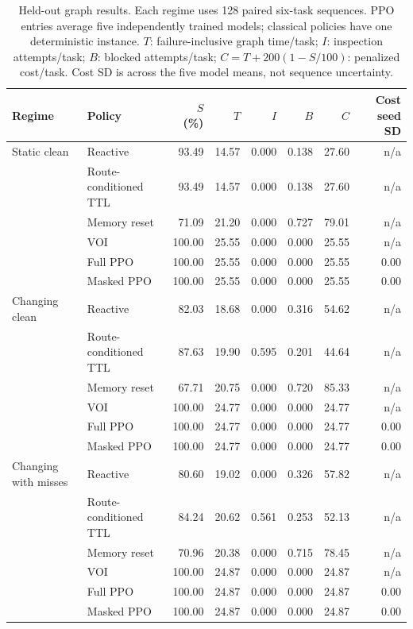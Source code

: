 \begin{table}[t]
\caption{Held-out graph results. Each regime uses 128 paired six-task sequences. PPO entries average five independently trained models; classical policies have one deterministic instance. $T$: failure-inclusive graph time/task; $I$: inspection attempts/task; $B$: blocked attempts/task; $C=T+200(1-S/100)$: penalized cost/task. Cost SD is across the five model means, not sequence uncertainty.}
\label{tab:results}\centering\small
\begin{tabular}{llrrrrrr}\hline
Regime & Policy & $S$ (\%) & $T$ & $I$ & $B$ & $C$ & Cost seed SD \\ \hline
Static clean & Reactive & 93.49 & 14.57 & 0.000 & 0.138 & 27.60 & n/a \\
 & Route-conditioned TTL & 93.49 & 14.57 & 0.000 & 0.138 & 27.60 & n/a \\
 & Memory reset & 71.09 & 21.20 & 0.000 & 0.727 & 79.01 & n/a \\
 & VOI & 100.00 & 25.55 & 0.000 & 0.000 & 25.55 & n/a \\
 & Full PPO & 100.00 & 25.55 & 0.000 & 0.000 & 25.55 & 0.00 \\
 & Masked PPO & 100.00 & 25.55 & 0.000 & 0.000 & 25.55 & 0.00 \\
\hline
Changing clean & Reactive & 82.03 & 18.68 & 0.000 & 0.316 & 54.62 & n/a \\
 & Route-conditioned TTL & 87.63 & 19.90 & 0.595 & 0.201 & 44.64 & n/a \\
 & Memory reset & 67.71 & 20.75 & 0.000 & 0.720 & 85.33 & n/a \\
 & VOI & 100.00 & 24.77 & 0.000 & 0.000 & 24.77 & n/a \\
 & Full PPO & 100.00 & 24.77 & 0.000 & 0.000 & 24.77 & 0.00 \\
 & Masked PPO & 100.00 & 24.77 & 0.000 & 0.000 & 24.77 & 0.00 \\
\hline
Changing with misses & Reactive & 80.60 & 19.02 & 0.000 & 0.326 & 57.82 & n/a \\
 & Route-conditioned TTL & 84.24 & 20.62 & 0.561 & 0.253 & 52.13 & n/a \\
 & Memory reset & 70.96 & 20.38 & 0.000 & 0.715 & 78.45 & n/a \\
 & VOI & 100.00 & 24.87 & 0.000 & 0.000 & 24.87 & n/a \\
 & Full PPO & 100.00 & 24.87 & 0.000 & 0.000 & 24.87 & 0.00 \\
 & Masked PPO & 100.00 & 24.87 & 0.000 & 0.000 & 24.87 & 0.00 \\
\hline
\end{tabular}
\end{table}
